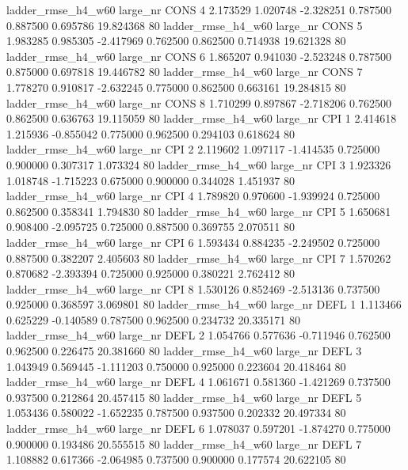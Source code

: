 ladder_rmse_h4_w60   large_nr     CONS                 4  2.173529  1.020748  -2.328251 0.787500 0.887500  0.695786   19.824368 80
 ladder_rmse_h4_w60   large_nr     CONS                 5  1.983285  0.985305  -2.417969 0.762500 0.862500  0.714938   19.621328 80
 ladder_rmse_h4_w60   large_nr     CONS                 6  1.865207  0.941030  -2.523248 0.787500 0.875000  0.697818   19.446782 80
 ladder_rmse_h4_w60   large_nr     CONS                 7  1.778270  0.910817  -2.632245 0.775000 0.862500  0.663161   19.284815 80
 ladder_rmse_h4_w60   large_nr     CONS                 8  1.710299  0.897867  -2.718206 0.762500 0.862500  0.636763   19.115059 80
 ladder_rmse_h4_w60   large_nr      CPI                 1  2.414618  1.215936  -0.855042 0.775000 0.962500  0.294103    0.618624 80
 ladder_rmse_h4_w60   large_nr      CPI                 2  2.119602  1.097117  -1.414535 0.725000 0.900000  0.307317    1.073324 80
 ladder_rmse_h4_w60   large_nr      CPI                 3  1.923326  1.018748  -1.715223 0.675000 0.900000  0.344028    1.451937 80
 ladder_rmse_h4_w60   large_nr      CPI                 4  1.789820  0.970600  -1.939924 0.725000 0.862500  0.358341    1.794830 80
 ladder_rmse_h4_w60   large_nr      CPI                 5  1.650681  0.908400  -2.095725 0.725000 0.887500  0.369755    2.070511 80
 ladder_rmse_h4_w60   large_nr      CPI                 6  1.593434  0.884235  -2.249502 0.725000 0.887500  0.382207    2.405603 80
 ladder_rmse_h4_w60   large_nr      CPI                 7  1.570262  0.870682  -2.393394 0.725000 0.925000  0.380221    2.762412 80
 ladder_rmse_h4_w60   large_nr      CPI                 8  1.530126  0.852469  -2.513136 0.737500 0.925000  0.368597    3.069801 80
 ladder_rmse_h4_w60   large_nr     DEFL                 1  1.113466  0.625229  -0.140589 0.787500 0.962500  0.234732   20.335171 80
 ladder_rmse_h4_w60   large_nr     DEFL                 2  1.054766  0.577636  -0.711946 0.762500 0.962500  0.226475   20.381660 80
 ladder_rmse_h4_w60   large_nr     DEFL                 3  1.043949  0.569445  -1.111203 0.750000 0.925000  0.223604   20.418464 80
 ladder_rmse_h4_w60   large_nr     DEFL                 4  1.061671  0.581360  -1.421269 0.737500 0.937500  0.212864   20.457415 80
 ladder_rmse_h4_w60   large_nr     DEFL                 5  1.053436  0.580022  -1.652235 0.787500 0.937500  0.202332   20.497334 80
 ladder_rmse_h4_w60   large_nr     DEFL                 6  1.078037  0.597201  -1.874270 0.775000 0.900000  0.193486   20.555515 80
 ladder_rmse_h4_w60   large_nr     DEFL                 7  1.108882  0.617366  -2.064985 0.737500 0.900000  0.177574   20.622105 80
